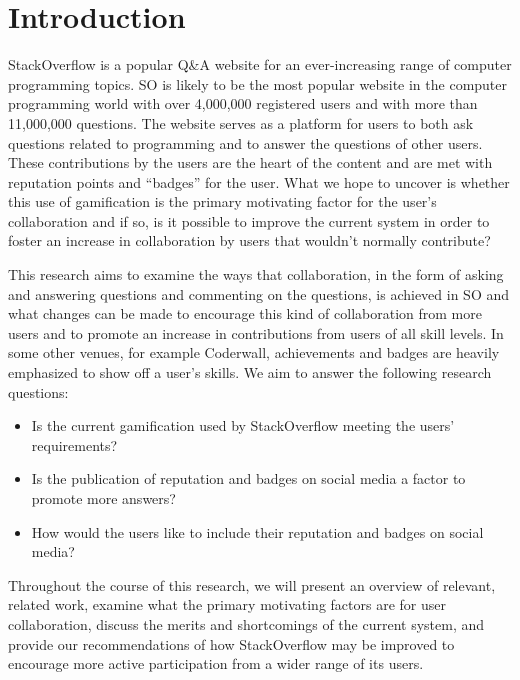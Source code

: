 \documentclass{sigchi}
\begin{document}

 

\section{Introduction}
StackOverflow is a popular Q\&A website for an ever-increasing range of
computer programming topics. SO is likely to be the most popular website in the
computer programming world with over 4,000,000 registered users and with more
than 11,000,000 questions. The website serves as a platform for users to both
ask questions related to programming and to answer the questions of other
users. These contributions by the users are the heart of the content and are
met with reputation points and “badges” for the user. What we hope to uncover
is whether this use of gamification is the primary motivating factor for the
user’s collaboration and if so, is it possible to improve the current system
in order to foster an increase in collaboration by users that wouldn’t normally
contribute?

This research aims to examine the ways that collaboration, in the form of
asking and answering questions and commenting on the questions, is achieved in
SO and what changes can be made to encourage this kind of collaboration from
more users and to promote an increase in contributions from users of all skill
levels. In some other venues, for example Coderwall, achievements and badges
are heavily emphasized to show off a user’s skills. We aim to answer the
following research questions:
\begin{itemize}
\item Is the current gamification used by StackOverflow meeting the users’
requirements?
\item Is the publication of reputation and badges on social media a factor to
promote more answers?
\item How would the users like to include their reputation and badges on social
media?
\end{itemize}
Throughout the course of this research, we will present an overview of
relevant, related work, examine what the primary motivating factors are for
user collaboration, discuss the merits and shortcomings of the current system,
and provide our recommendations of how StackOverflow may be improved to
encourage more active participation from a wider range of its users.
\end{document}
